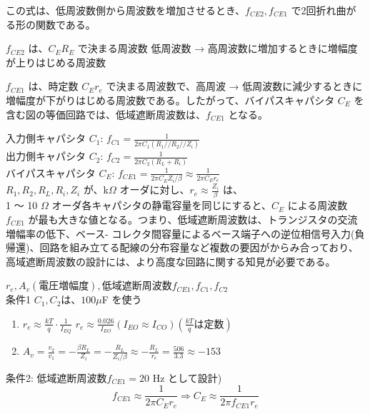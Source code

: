 この式は、低周波数側から周波数を増加させるとき、$f_{CE2}, f_{CE1}$ で2回折れ曲がる形の関数である。

$f_{CE2}$ は、$C_E R_E$ で決まる周波数
低周波数 → 高周波数に増加するときに増幅度が上りはじめる周波数

$f_{CE1}$ は、時定数 $C_E r_e$ で決まる周波数で、高周波 → 低周波数に減少するときに
増幅度が下がりはじめる周波数である。したがって、バイパスキャパシタ $C_E$ を含む図の等価回路では、低域遮断周波数は、$f_{CE1}$ となる。

入力側キャパシタ $C_1$: $f_{C1} = \frac{1}{2\pi C_1(R_1//R_2//Z_i)}$\\
出力側キャパシタ $C_2$: $f_{C2} = \frac{1}{2\pi C_2(R_L+R_i)}$\\
バイパスキャパシタ $C_E$: $f_{CE1} = \frac{1}{2\pi C_E Z_i/\beta} \approx \frac{1}{2\pi C_E r_e}$\\

$R_1, R_2, R_L, R_i, Z_i$ が、k$\Omega$ オーダに対し、$r_e \approx \frac{Z_i}{\beta}$ は、\\
1 ～ 10 $\Omega$ オーダ各キャパシタの静電容量を同じにすると、$C_E$ による周波数 $f_{CE1}$ が最も大きな値となる。つまり、低域遮断周波数は、トランジスタの交流増幅率の低下、ベース- コレクタ間容量によるベース端子への逆位相信号入力(負帰還)、回路を組み立てる配線の分布容量など複数の要因がからみ合っており、高域遮断周波数の設計には、より高度な回路に関する知見が必要である。

$r_e, A_v(電圧増幅度), 低域遮断周波数 f_{CE1}, f_{C1}, f_{C2}$\\
条件1 $C_1, C_2$は、$100 \mu$F を使う
\begin{enumerate}
  \setlength{\parskip}{0cm} %
  \setlength{\itemsep}{0cm} %
  \item $r_e \approx \frac{kT}{q} \cdot \frac{1}{I_{EQ}}$
  $r_e \approx \frac{0.026}{I_{EO}} (I_{EO} \approx I_{CO}) (\frac{kT}{q} は定数)$
  \item $A_v = \frac{v_2}{v_1} = -\frac{\beta R_L}{Z_i} = -\frac{R_L}{Z_i/\beta} \approx -\frac{R_L}{r_e} = \frac{506}{3.3} \approx -153$
\end{enumerate}

条件2: 低域遮断周波数$f_{CE1} = 20$ Hz として設計)
$$f_{CE1} \approx \frac{1}{2\pi C_E r_e} \Rightarrow C_E \approx \frac{1}{2\pi f_{CE1}r_e}$$


